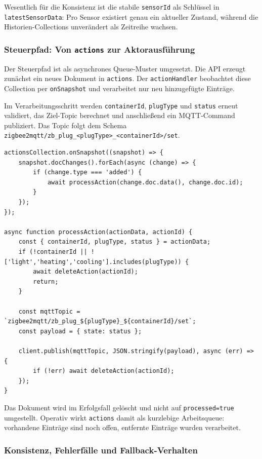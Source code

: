 Wesentlich für die Konsistenz ist die stabile \texttt{sensorId} als Schlüssel in \texttt{latestSensorData}: Pro Sensor existiert genau ein aktueller Zustand, während die Historien-Collections unverändert als Zeitreihe wachsen.

\subsubsection{Steuerpfad: Von \texttt{actions} zur Aktorausführung}

Der Steuerpfad ist als asynchrones Queue-Muster umgesetzt. Die API erzeugt zunächst ein neues Dokument in \texttt{actions}. Der \texttt{actionHandler} beobachtet diese Collection per \texttt{onSnapshot} und verarbeitet nur neu hinzugefügte Einträge.

Im Verarbeitungsschritt werden \texttt{containerId}, \texttt{plugType} und \texttt{status} erneut validiert, das Ziel-Topic berechnet und anschließend ein MQTT-Command publiziert. Das Topic folgt dem Schema \texttt{zigbee2mqtt/zb\_plug\_<plugType>\_<containerId>/set}.

\begin{lstlisting}[caption={Asynchroner Steuerpfad im actionHandler},label={lst:db:flow:control-path},basicstyle=\ttfamily\small,breaklines=true,breakatwhitespace=false,columns=fullflexible]
actionsCollection.onSnapshot((snapshot) => {
    snapshot.docChanges().forEach(async (change) => {
        if (change.type === 'added') {
            await processAction(change.doc.data(), change.doc.id);
        }
    });
});

async function processAction(actionData, actionId) {
    const { containerId, plugType, status } = actionData;
    if (!containerId || !['light','heating','cooling'].includes(plugType)) {
        await deleteAction(actionId);
        return;
    }

    const mqttTopic = `zigbee2mqtt/zb_plug_${plugType}_${containerId}/set`;
    const payload = { state: status };

    client.publish(mqttTopic, JSON.stringify(payload), async (err) => {
        if (!err) await deleteAction(actionId);
    });
}
\end{lstlisting}

Das Dokument wird im Erfolgsfall gelöscht und nicht auf \texttt{processed=true} umgestellt. Operativ wirkt \texttt{actions} damit als kurzlebige Arbeitsqueue: vorhandene Einträge sind noch offen, entfernte Einträge wurden verarbeitet.

\subsubsection{Konsistenz, Fehlerfälle und Fallback-Verhalten}

